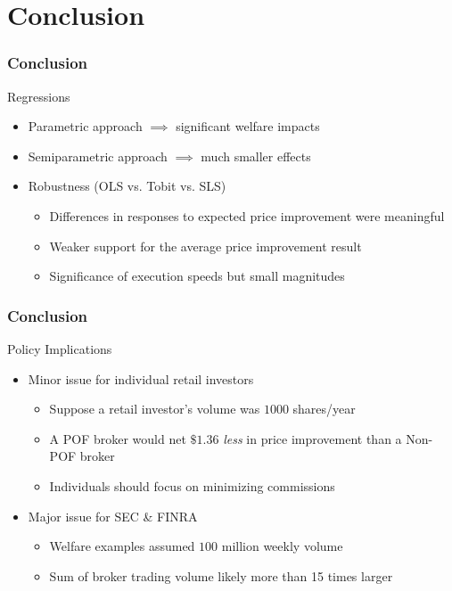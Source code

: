 \documentclass[11pt]{beamer}
\begin{document}
\section{Conclusion}


\begin{frame}
\frametitle{Conclusion}

\begin{block}
	{Regressions}
	\begin{itemize}
		\setlength\itemsep{0.4em}
		\item Parametric approach $\implies$ significant welfare impacts 
		\item Semiparametric approach $\implies$ much smaller effects
		\item Robustness (OLS vs. Tobit vs. SLS)
		\begin{itemize}
			\setlength\itemsep{0.4em}
			\vspace{0.2em}
			\item Differences in responses to expected price improvement were meaningful
			\item Weaker support for the average price improvement result 
			\item Significance of execution speeds but small magnitudes
		\end{itemize}
	\end{itemize}

\end{block}

\end{frame}

\begin{frame}
\frametitle{Conclusion}

\begin{block}
	{Policy Implications}
	\begin{itemize}
		\setlength\itemsep{0.4em}
		\item Minor issue for individual retail investors
		\begin{itemize}
			\setlength\itemsep{0.4em}
			\vspace{0.2em}
			\item Suppose a retail investor's volume was $1000$ shares/year
			\item A POF broker would net $\$1.36$ \textit{less} in price improvement than a Non-POF broker
			\item Individuals should  focus on minimizing commissions 
		\end{itemize}
		\item Major issue for SEC \& FINRA
		\begin{itemize}
			\setlength\itemsep{0.4em}
			\vspace{0.2em}
			\item Welfare examples assumed $100$ million weekly volume
			\item Sum of broker trading volume likely more than 15 times larger
		\end{itemize}
	\end{itemize}
\end{block}

\end{frame}
\end{document}
